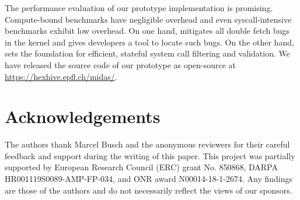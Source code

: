 \documentclass[letterpaper,twocolumn,10pt]{article}
\begin{document}
The performance evaluation of our prototype implementation is promising.
Compute-bound benchmarks have negligible overhead and even syscall-intensive
benchmarks exhibit low overhead. On one hand, \midas mitigates all double fetch
bugs in the kernel and gives developers a tool to locate such bugs. On the other
hand, \midas sets the foundation for efficient, stateful system call filtering
and validation. 
%
We have released the source code of our prototype as open-source at 
\url{https://hexhive.epfl.ch/midas/}.

\section*{Acknowledgements}
The authors thank Marcel Busch and the anonymous reviewers for their careful
feedback and support during the writing of this 
paper. 
%
This project was partially supported by European Research Council (ERC)
grant No. 850868, DARPA HR001119S0089-AMP-FP-034, and ONR award
N00014-18-1-2674. Any findings are those of the authors and do not necessarily
reflect the views of our sponsors.


\balance



\end{document}
